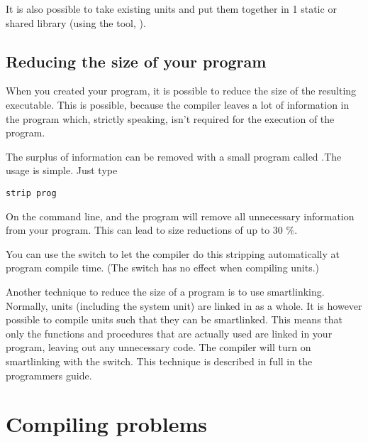 It is also possible to take existing units and put them
together in 1 static or shared library (using the  tool,
).

\section{Reducing the size of your program}

When you created your program, it is possible to reduce the size of the
resulting executable. This is possible, because the compiler leaves a 
lot of information in the program which, strictly speaking, isn't required 
for the execution of the program. 

The surplus of information can be removed with a small program
called .The usage is simple. Just type
\begin{verbatim}
strip prog
\end{verbatim}
On the command line, and the  program will remove all unnecessary
information from your program. This can lead to size reductions of up to
30 \%.

You can use the  switch to let the compiler do this stripping
automatically at program compile time. (The switch has no effect when
compiling units.)

Another technique to reduce the size of a program is to use smartlinking.
Normally, units (including the system unit) are linked in as a whole.
It is however possible to compile units such that they can be smartlinked.
This means that only the functions and procedures that are actually used
are linked in your program, leaving out any unnecessary code. The compiler 
will turn on smartlinking with the  switch. This technique is 
described in full in the programmers guide. 

\chapter{Compiling problems}

